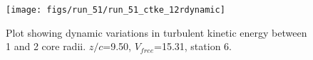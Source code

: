 \begin{figure}[H]
\centering
\texttt{[image: figs/run\_51/run\_51\_ctke\_12rdynamic]}
\caption{Plot showing dynamic variations in turbulent kinetic energy between 1 and 2 core radii. $z/c$=9.50, $V_{free}$=15.31, station 6.}
\end{figure}


